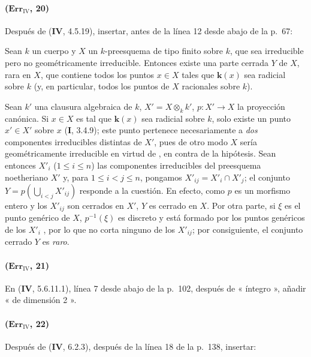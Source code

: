 \paragraph{($\mathbf{Err}_{\mathrm{IV}}$, 20)}
Después de (\textbf{IV}, 4.5.19), insertar, antes de la línea 12 desde abajo de la p.~67:

\begin{corollary}[4.5.19.3]
\label{IV.4.5.19.3}
Sean $k$ un cuerpo y $X$ un $k$-preesquema de tipo finito sobre $k$, que sea
irreducible pero no geométricamente irreducible. Entonces existe una
parte cerrada $Y$ de $X$, rara en $X$, que contiene todos los puntos
$x\in X$ tales que $\boldsymbol{k}(x)$ sea radicial sobre $k$ (y, en particular, todos
los puntos de $X$ racionales sobre $k$).
\end{corollary}

Sean $k'$ una clausura algebraica de $k$, $X'=X\otimes_kk'$,
$p:X'\to X$ la proyección canónica. Si $x\in X$ es tal que $\boldsymbol{k}(x)$
sea radicial sobre $k$, solo existe un punto $x'\in X'$ sobre
$x$ (\textbf I, 3.4.9); este punto pertenece necesariamente a \emph{dos} componentes
irreducibles distintas de $X'$, pues de otro modo $X$ sería geométricamente
irreducible en virtud de
{}, en contra de
la hipótesis. Sean entonces $X'_i$ ($1\leq i\leq n$) las componentes
irreducibles del preesquema noetheriano $X'$ y, para
$1\leq i<j\leq n$, pongamos $X'_{ij}=X'_i\cap X'_j$; el conjunto
$Y=p(\bigcup_{i<j}X'_{ij})$
responde a la cuestión. En efecto, como $p$ es un morfismo entero y
los $X'_{ij}$ son cerrados en $X'$, $Y$ es cerrado en $X$.
Por otra parte, si $\xi$ es el punto genérico de $X$, $p^{-1}(\xi)$
es discreto y está formado por los puntos genéricos de los $X'_i$
{}, por lo que no corta ninguno
de los $X'_{ij}$; por consiguiente, el conjunto cerrado $Y$ es \emph{raro}.

\paragraph{($\mathbf{Err}_{\mathrm{IV}}$, 21)}
En (\textbf{IV}, 5.6.11.1), línea 7 desde abajo de la p.~102, después de « íntegro »,
añadir « de dimensión 2 ».

\paragraph{($\mathbf{Err}_{\mathrm{IV}}$, 22)}
Después de (\textbf{IV}, 6.2.3), después de la línea 18 de la p.~138, insertar:

